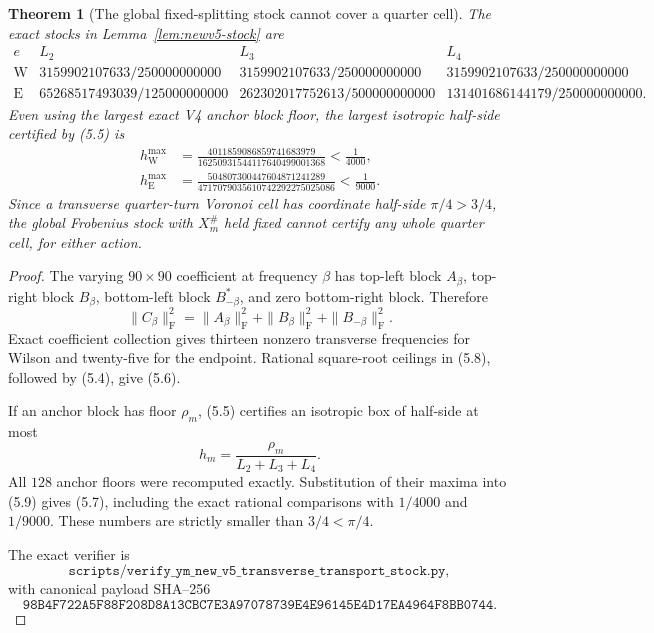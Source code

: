 \documentclass[11pt,oneside]{article}
\newtheorem{theorem}{Theorem}[section]
\theoremstyle{definition}
\theoremstyle{remark}
\begin{document}
\begin{theorem}[The global fixed-splitting stock cannot cover a quarter cell]
\label{thm:newv5-no-cover}
The exact stocks in Lemma~\ref{lem:newv5-stock} are
\[
\begin{array}{c|c|c|c}
e&L_2&L_3&L_4\\ \hline
\mathrm W&
3159902107633/250000000000&
3159902107633/250000000000&
3159902107633/250000000000\\
\mathrm E&
65268517493039/125000000000&
262302017752613/500000000000&
131401686144179/250000000000 .
\end{array}                                                \tag{5.6}
\]
Even using the \emph{largest} exact V4 anchor block floor, the
largest isotropic half-side certified by (5.5) is
\[
\begin{aligned}
h_{\mathrm W}^{\max}
&=
\frac{4011859086859741683979}
{16250931544117640499001368}
<\frac1{4000},\\
h_{\mathrm E}^{\max}
&=
\frac{504807300447604871241289}
{4717079035610742292275025086}
<\frac1{9000}.
\end{aligned}
\tag{5.7}
\]
Since a transverse quarter-turn Voronoi cell has coordinate
half-side \(\pi/4>3/4\), the global Frobenius stock with \(X_m^\#\)
held fixed cannot certify any whole quarter cell, for either action.
\end{theorem}

\begin{proof}
The varying \(90\times90\) coefficient at frequency \(\beta\) has
top-left block \(A_\beta\), top-right block \(B_\beta\),
bottom-left block \(B_{-\beta}^*\), and zero bottom-right block.
Therefore
\[
 \|C_\beta\|_{\mathrm F}^2
 =\|A_\beta\|_{\mathrm F}^2
  +\|B_\beta\|_{\mathrm F}^2
  +\|B_{-\beta}\|_{\mathrm F}^2.                          \tag{5.8}
\]
Exact coefficient collection gives thirteen nonzero transverse
frequencies for Wilson and twenty-five for the endpoint.  Rational
square-root ceilings in (5.8), followed by (5.4), give (5.6).

If an anchor block has floor \(\rho_m\), (5.5) certifies an isotropic
box of half-side at most
\[
 h_m=\frac{\rho_m}{L_2+L_3+L_4}.                          \tag{5.9}
\]
All \(128\) anchor floors were recomputed exactly.  Substitution of
their maxima into (5.9) gives (5.7), including the exact rational
comparisons with \(1/4000\) and \(1/9000\).  These numbers are
strictly smaller than \(3/4<\pi/4\).

The exact verifier is
\[
\texttt{scripts/verify\_ym\_new\_v5\_transverse\_transport\_stock.py},
\]
with canonical payload SHA--256
\[
\texttt{98B4F722A5F88F208D8A13CBC7E3A97078739E4E96145E4D17EA4964F8BB0744}.
                                                               \tag{5.10}
\]
\end{proof}
\end{document}
